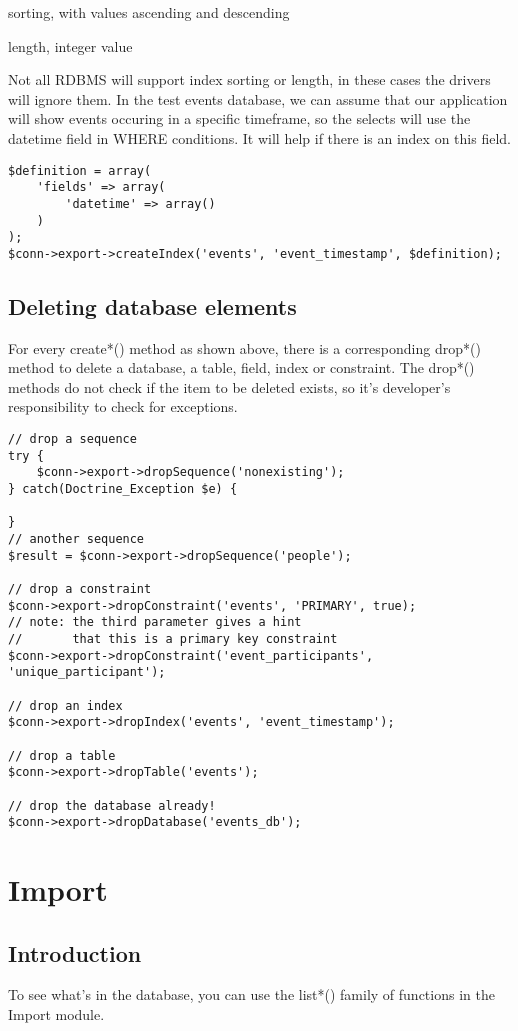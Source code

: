 \documentclass[11pt,a4paper]{report}
\begin{document}
sorting, with values ascending and descending

length, integer value

Not all RDBMS will support index sorting or length, in these cases the drivers will ignore them. In the test events database, we can assume that our application will show events occuring in a specific timeframe, so the selects will use the datetime field in WHERE conditions. It will help if there is an index on this field.

\begin{verbatim}
$definition = array(
    'fields' => array(
        'datetime' => array()
    )
);
$conn->export->createIndex('events', 'event_timestamp', $definition);
\end{verbatim}

\subsection{Deleting database elements}
For every create*() method as shown above, there is a corresponding drop*() method to delete a database, a table, field, index or constraint. The drop*() methods do not check if the item to be deleted exists, so it's developer's responsibility to check for exceptions.

\begin{verbatim}
// drop a sequence
try {
    $conn->export->dropSequence('nonexisting');
} catch(Doctrine_Exception $e) {

}
// another sequence
$result = $conn->export->dropSequence('people');

// drop a constraint
$conn->export->dropConstraint('events', 'PRIMARY', true);
// note: the third parameter gives a hint
//       that this is a primary key constraint
$conn->export->dropConstraint('event_participants', 'unique_participant');

// drop an index
$conn->export->dropIndex('events', 'event_timestamp');

// drop a table
$conn->export->dropTable('events');

// drop the database already!
$conn->export->dropDatabase('events_db');
\end{verbatim}

\section{Import}
\subsection{Introduction}
To see what's in the database, you can use the list*() family of functions in the Import module.
\end{document}
